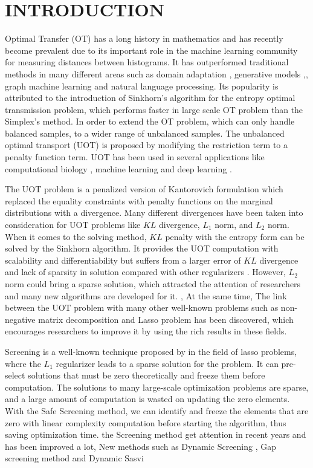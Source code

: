 \section{INTRODUCTION}
Optimal Transfer (OT) has a long history in mathematics and has recently become prevalent due to its important role in the machine learning community for measuring distances between histograms. It has outperformed traditional methods in many different areas such as domain adaptation \citep{7586038}, generative models \citep{arjovsky2017wasserstein},, graph machine learning \citep{NEURIPS2019_fdd5b16f} and natural language processing. \citep{084adf2f555549c493e0331a00e4ecad} Its popularity is attributed to the introduction of Sinkhorn's algorithm for the entropy optimal transmission problem, \citep{NIPS2013_af21d0c9} which performs faster in large scale OT problem than the Simplex's method. In order to extend the OT problem, which can only handle balanced samples, to a wider range of unbalanced samples. The unbalanced optimal transport (UOT) is proposed by modifying the restriction term to a penalty function term. UOT has been used in several applications like computational biology \citep{SCHIEBINGER2019928} , machine learning \citep{DBLP:conf/aistats/JanatiCG19} and deep learning \citep{DBLP:conf/iclr/YangU19}. 

The UOT problem is a penalized version of Kantorovich formulation which replaced the equality constraints with penalty functions on the marginal distributions with a divergence. Many different divergences have been taken into consideration for UOT problems like $KL$ divergence, $L_1$ norm, and $L_2$ norm. When it comes to the solving method, $KL$ penalty with the entropy form can be solved by the Sinkhorn algorithm. It provides the UOT computation with scalability and differentiability but suffers from a larger error of $KL$ divergence and lack of sparsity in solution compared with other regularizers \citep{DBLP:conf/aistats/BlondelSR18}. However, $L_2$ norm could bring a sparse solution, which attracted the attention of researchers and many new algorithms are developed for it. \citep{NEURIPS2021_c3c617a9}, \citep{https://doi.org/10.48550/arxiv.2202.03618} At the same time, The link between the UOT problem with many other well-known problems such as non-negative matrix decomposition and Lasso problem has been discovered, which encourages researchers to improve it by using the rich results in these fields.

Screening is a well-known technique proposed by \citep{ghaoui2010safe} in the field of lasso problems, where the $L_1$ regularizer leads to a sparse solution for the problem. It can pre-select solutions that must be zero theoretically and freeze them before computation. The solutions to many large-scale optimization problems are sparse, and a large amount of computation is wasted on updating the zero elements. With the Safe Screening method, we can identify and freeze the elements that are zero with linear complexity computation before starting the algorithm, thus saving optimization time. the Screening method get attention in recent years and has been improved a lot, New methods such as Dynamic Screening \citep{7128732}, Gap screening method \citep{JMLR:v18:16-577} and Dynamic Sasvi \citep{NEURIPS2021_7b5b23f4}  

